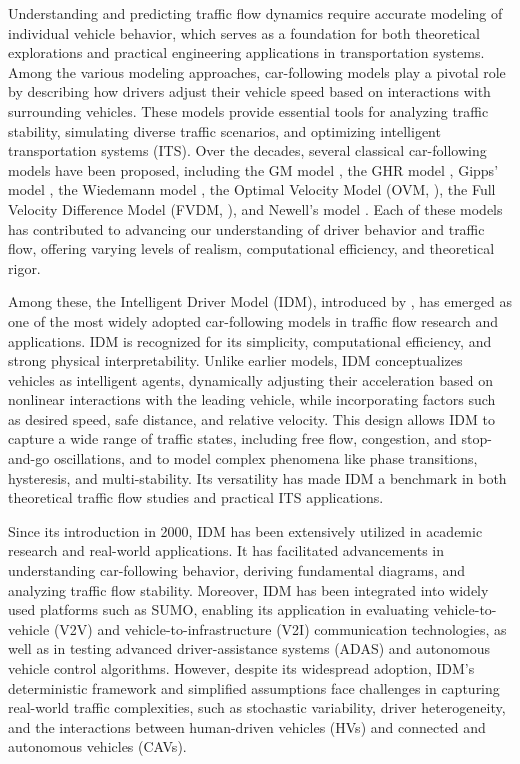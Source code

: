 \documentclass[a4paper,fleqn]{cas-sc}
\begin{document}
Understanding and predicting traffic flow dynamics require accurate modeling of individual vehicle behavior, which serves as a foundation for both theoretical explorations and practical engineering applications in transportation systems. Among the various modeling approaches, car-following models play a pivotal role by describing how drivers adjust their vehicle speed based on interactions with surrounding vehicles. These models provide essential tools for analyzing traffic stability, simulating diverse traffic scenarios, and optimizing intelligent transportation systems (ITS). Over the decades, several classical car-following models have been proposed, including the GM model \citep{chandlerTrafficDynamicsStudiesCar1958}, the GHR model \citep{gazisNonlinearFollowLeaderModelsTraffic1961}, Gipps’ model \citep{gippsBehaviouralCarfollowingModelComputer1981}, the Wiedemann model \citep{wiedemann1992microscopic}, the Optimal Velocity Model (OVM, \cite{bandoDynamicalModelTrafficCongestion1995}), the Full Velocity Difference Model (FVDM, \cite{jiangFullVelocityDifferenceModel2001}), and Newell’s model \citep{newellSimplifiedCarfollowingTheoryLower2002}. Each of these models has contributed to advancing our understanding of driver behavior and traffic flow, offering varying levels of realism, computational efficiency, and theoretical rigor.

Among these, the Intelligent Driver Model (IDM), introduced by \cite{treiberCongestedTrafficStatesEmpirical2000}, has emerged as one of the most widely adopted car-following models in traffic flow research and applications. IDM is recognized for its simplicity, computational efficiency, and strong physical interpretability. Unlike earlier models, IDM conceptualizes vehicles as intelligent agents, dynamically adjusting their acceleration based on nonlinear interactions with the leading vehicle, while incorporating factors such as desired speed, safe distance, and relative velocity. This design allows IDM to capture a wide range of traffic states, including free flow, congestion, and stop-and-go oscillations, and to model complex phenomena like phase transitions, hysteresis, and multi-stability. Its versatility has made IDM a benchmark in both theoretical traffic flow studies and practical ITS applications.

Since its introduction in 2000, IDM has been extensively utilized in academic research and real-world applications. It has facilitated advancements in understanding car-following behavior, deriving fundamental diagrams, and analyzing traffic flow stability. Moreover, IDM has been integrated into widely used platforms such as SUMO, enabling its application in evaluating vehicle-to-vehicle (V2V) and vehicle-to-infrastructure (V2I) communication technologies, as well as in testing advanced driver-assistance systems (ADAS) and autonomous vehicle control algorithms. However, despite its widespread adoption, IDM’s deterministic framework and simplified assumptions face challenges in capturing real-world traffic complexities, such as stochastic variability, driver heterogeneity, and the interactions between human-driven vehicles (HVs) and connected and autonomous vehicles (CAVs).
\end{document}
